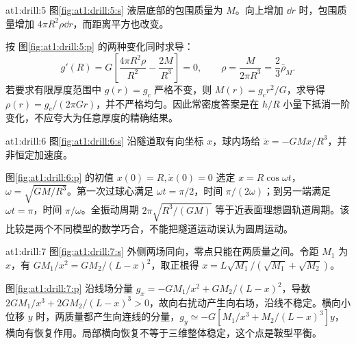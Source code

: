 \begin{drillsolution}{at1:drill:5}
图\ref{fig:at1:drill:5:s} 液层底部的包围质量为 $M$。向上增加 $\dd r$ 时，包围质量增加 $4\pi R^2\rho\dd r$，而距离平方也改变。

按 图\ref{fig:at1:drill:5:p} 的两种变化同时求导：
\[g'(R)=G\left[\frac{4\pi R^2\rho}{R^2}-\frac{2M}{R^3}\right]=0,
\qquad\rho=\frac{M}{2\pi R^3}=\frac23\bar\rho_M.
\]
若要求有限厚度范围中 $g(r)=g_c$ 严格不变，则 $M(r)=g_cr^2/G$，求导得 $\rho(r)=g_c/(2\pi Gr)$，并不严格均匀。因此常密度答案是在 $h/R$ 小量下抵消一阶变化，不应夸大为任意厚度的精确结果。\end{drillsolution}
\begin{drillsolution}{at1:drill:6}
图\ref{fig:at1:drill:6:s} 沿隧道取有向坐标 $x$，球内场给 $\ddot x=-GMx/R^3$，并非恒定加速度。

图\ref{fig:at1:drill:6:p} 的初值 $x(0)=R,\dot x(0)=0$ 选定 $x=R\cos\omega t$，$\omega=\sqrt{GM/R^3}$。第一次过球心满足 $\omega t=\pi/2$，时间 $\pi/(2\omega)$；到另一端满足 $\omega t=\pi$，时间 $\pi/\omega$。全振动周期 $2\pi\sqrt{R^3/(GM)}$ 等于近表面理想圆轨道周期。该比较是两个不同模型的数学巧合，不能把隧道运动误认为圆周运动。\end{drillsolution}
\begin{drillsolution}{at1:drill:7}
  图\ref{fig:at1:drill:7:s} 外侧两场同向，零点只能在两质量之间。令距 $M_1$ 为 $x$，有 $GM_1/x^2=GM_2/(L-x)^2$，取正根得 $x=L\sqrt{M_1}/(\sqrt{M_1}+\sqrt{M_2})$。

  图\ref{fig:at1:drill:7:p} 沿线场分量 $g_x=-GM_1/x^2+GM_2/(L-x)^2$，导数 $2GM_1/x^3+2GM_2/(L-x)^3>0$，故向右扰动产生向右场，沿线不稳定。横向小位移 $y$ 时，两质量都产生向连线的分量，$g_y\simeq-G[M_1/x^3+M_2/(L-x)^3]y$，横向有恢复作用。局部横向恢复不等于三维整体稳定，这个点是鞍型平衡。\end{drillsolution}
